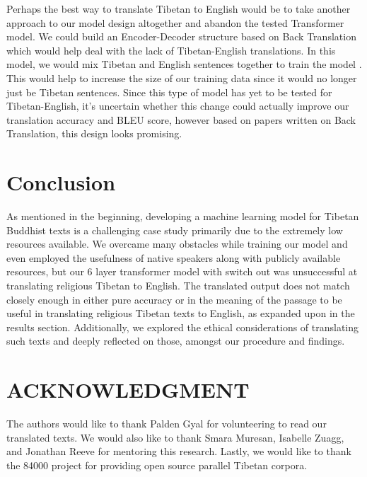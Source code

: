 \documentclass[letterpaper, 12 pt, conference]{ieeeconf}  %
\begin{document}
Perhaps the best way to translate Tibetan to English would be to take another approach to our model design altogether and abandon the tested Transformer model. We could build an Encoder-Decoder structure based on Back Translation which would help deal with the lack of Tibetan-English translations. In this model, we would mix Tibetan and English sentences together to train the model \cite{10}. This would help to increase the size of our training data since it would no longer just be Tibetan sentences. Since this type of model has yet to be tested for Tibetan-English, it's uncertain whether this change could actually improve our translation accuracy and BLEU score, however based on papers written on Back Translation, this design looks promising.


\section{Conclusion}


As mentioned in the beginning, developing a machine learning model for Tibetan Buddhist texts is a challenging case study primarily due to the extremely low resources available. We overcame many obstacles while training our model and even employed the usefulness of native speakers along with publicly available resources, but our 6 layer transformer model with switch out was unsuccessful at translating religious Tibetan to English. The translated output does not match closely enough in either pure accuracy or in the meaning of the passage to be useful in translating religious Tibetan texts to English, as expanded upon in the results section. Additionally, we explored the ethical considerations of translating such texts and deeply reflected on those, amongst our procedure and findings.




\section*{ACKNOWLEDGMENT}

The authors would like to thank Palden Gyal for volunteering to read our translated texts. We would also like to thank Smara Muresan, Isabelle Zuagg, and Jonathan Reeve for mentoring this research. Lastly, we would like to thank the 84000 project for providing open source parallel Tibetan corpora. 
\end{document}
